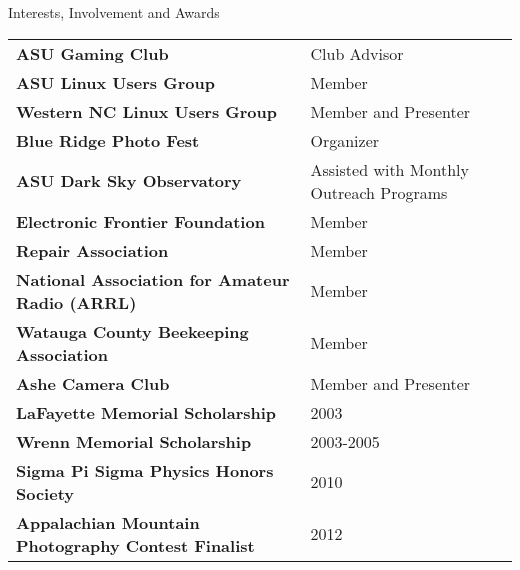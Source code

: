 \documentclass{cv} %
\begin{document}
\begin{rSection}{Interests, Involvement and Awards}

\begin{tabular}{ @{} >{\bfseries}l @{\hspace{6ex}} l }
ASU Gaming Club & Club Advisor\\
ASU Linux Users Group & Member\\
Western NC Linux Users Group & Member and Presenter\\
Blue Ridge Photo Fest & Organizer\\
ASU Dark Sky Observatory & Assisted with Monthly Outreach Programs\\
Electronic Frontier Foundation & Member\\
Repair Association & Member\\
National Association for Amateur Radio (ARRL) & Member\\
Watauga County Beekeeping Association & Member \\
Ashe Camera Club & Member and Presenter\\
LaFayette Memorial Scholarship & 2003 \\
Wrenn Memorial Scholarship & 2003-2005 \\
Sigma Pi Sigma Physics Honors Society & 2010 \\
Appalachian Mountain Photography Contest Finalist & 2012 \\


\end{tabular}

\end{rSection}
\end{document}
